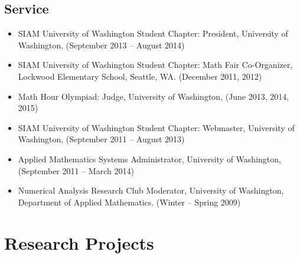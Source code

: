 \documentclass{article}
\begin{document}
\subsection*{Service}
\begin{itemize}
  \item {SIAM University of Washington Student Chapter: President},
    University of Washington, (September 2013 -- August 2014)
  \item {SIAM University of Washington Student Chapter: Math Fair
    Co-Organizer}, Lockwood Elementary School, Seattle, WA. (December
    2011, 2012)
  \item {Math Hour Olympiad: Judge}, University of Washington, (June
    2013, 2014, 2015)
  \item {SIAM University of Washington Student Chapter: Webmaster},
    University of Washington, (September 2011 -- August 2013)
  \item {Applied Mathematics Systems Administrator}, University of
    Washington, (September 2011 -- March 2014)
  \item {Numerical Analysis Research Club Moderator}, University of
    Washington, Department of Applied Mathematics. (Winter -- Spring
    2009)
\end{itemize}



\section*{Research Projects}
\end{document}
